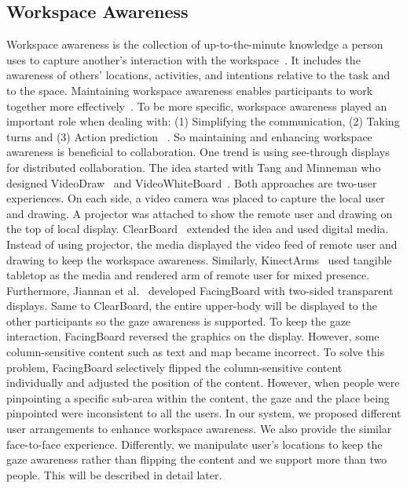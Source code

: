 \documentclass{sigchi}
\begin{document}
\subsection{Workspace Awareness}
Workspace awareness is the collection of up-to-the-minute knowledge a person uses to capture another's interaction with the workspace~\cite{gutwin1996workspace}. It includes the awareness of others' locations, activities, and intentions relative to the task and to the space. Maintaining workspace awareness enables participants to work together more effectively~\cite{gutwin1998design, gutwin2002descriptive}. To be more specific, workspace awareness played an important role when dealing with: (1) Simplifying the communication, (2) Taking turns and (3) Action prediction ~\cite{gutwin2002descriptive}. So maintaining and enhancing workspace awareness is beneficial to collaboration. One trend is using see-through displays for distributed collaboration. The idea started with Tang and Minneman who designed VideoDraw~\cite{tang1990videodraw} and VideoWhiteBoard~\cite{tang1991videowhiteboard}. Both approaches are two-user experiences. On each side, a video camera was placed to capture the local user and drawing. A projector was attached to show the remote user and drawing on the top of local display. ClearBoard~\cite{ishii1992clearboard} extended the idea and used digital media. Instead of using projector, the media displayed the video feed of remote user and drawing to keep the workspace awareness. Similarly, KinectArms~\cite{genest2013kinectarms} used tangible tabletop as the media and rendered arm of remote user for mixed presence. Furthermore, Jiannan et al.~\cite{li2014interactive} developed FacingBoard with two-sided transparent displays. Same to ClearBoard, the entire upper-body will be displayed to the other participants so the gaze awareness is supported. To keep the gaze interaction, FacingBoard reversed the graphics on the display. However, some column-sensitive content such as text and map became incorrect. To solve this problem, FacingBoard selectively flipped the column-sensitive content individually and adjusted the position of the content. However, when people were pinpointing a specific sub-area within the content, the gaze and the place being pinpointed were inconsistent to all the users. In our system, we proposed different user arrangements to enhance workspace awareness. We also provide the similar face-to-face experience. Differently, we manipulate user's locations to keep the gaze awareness rather than flipping the content and we support more than two people. This will be described in detail later.
\end{document}
